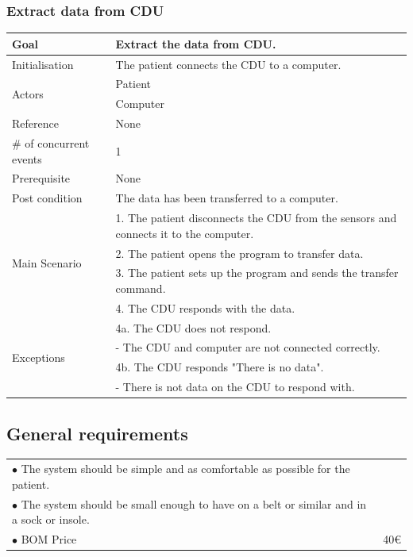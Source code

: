 \subsubsection{Extract data from CDU}
\begin{table}[H]
	\centering
	\begin{tabular}{|l|p{10cm}|}
	\hline
	Goal 							& Extract the data from CDU.\\ \hline
	Initialisation 					& The patient connects the CDU to a computer. \\ \hline
	\multirow{2}{*}{Actors} 		& Patient \\ 
									& Computer \\\hline
	Reference 						& None \\ \hline
	\# of concurrent events 		& 1 \\ \hline
	Prerequisite  					& None \\ \hline
	Post condition 					& The data has been transferred to a computer. \\ \hline
	\multirow{4}{*}{Main Scenario} 	& 1. The patient disconnects the CDU from the sensors and connects it to the computer. \\
									& 2. The patient opens the program to transfer data.\\
									& 3. The patient sets up the program and sends the transfer command.\\ 
									& 4. The CDU responds with the data. \\ \hline
	\multirow{4}{*}{Exceptions} & 4a. The CDU does not respond. \\ 
								& - The CDU and computer are not connected correctly.\\											& 4b. The CDU responds "There is no data". \\
								& - There is not data on the CDU to respond with.\\\hline
	\end{tabular}
\end{table}



\subsection{General requirements}
\begin{table}[H]
\begin{tabular}{p{10cm} p{2cm}}
$\bullet$ The system should be simple and as comfortable as possible for the patient. & \\
$\bullet$ The system should be small enough to have on a belt or similar and in a sock or insole. &\\
$\bullet$ BOM Price & 40€\\
\end{tabular}
\end{table}


